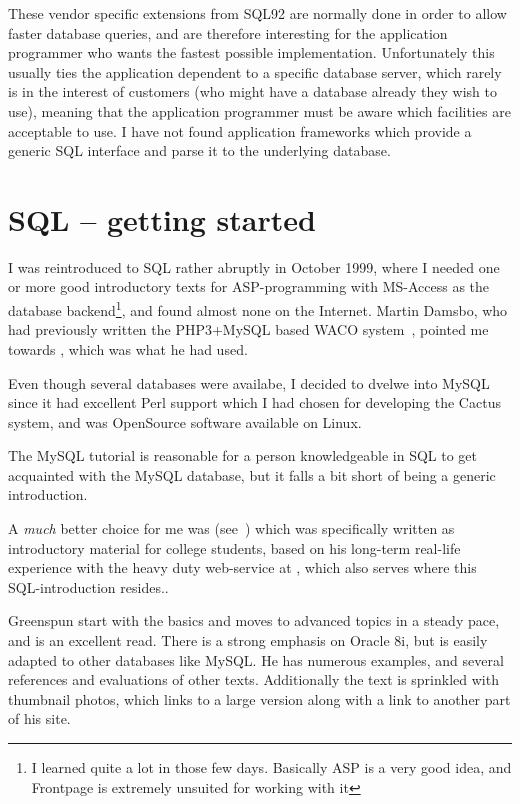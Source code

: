 These vendor specific extensions from SQL92 are normally done in order
to allow faster database queries, and are therefore interesting for
the application programmer who wants the fastest possible
implementation.  Unfortunately this usually ties the application
dependent to a specific database server, which rarely is in the
interest of customers (who might have a database already they wish to
use), meaning that the application programmer must be aware which
facilities are acceptable to use.  I have not found application
frameworks which provide a generic SQL interface and parse it to the
underlying database.


\section{SQL -- getting started}
\label{sec:sql-getting-started}

I was reintroduced to SQL rather abruptly in October 1999, where I
needed one or more good introductory texts for ASP-programming with
MS-Access as the database backend\footnote{I learned quite a lot in
  those few days.  Basically ASP is a very good idea, and Frontpage is
  extremely unsuited for working with it}, and found almost none on
the Internet.  Martin Damsbo, who had previously written the
PHP3+MySQL based WACO system~\cite{mez-waco}, pointed me towards
, which was what he had used.

Even though several databases were availabe, I decided to dvelwe into
MySQL since it had excellent Perl support which I had chosen for
developing the Cactus system,
and was OpenSource software available on Linux.

The MySQL tutorial is reasonable for a person knowledgeable in SQL to
get acquainted with the MySQL database, but it falls a bit short of
being a generic introduction.


A \textit{much} better choice for me was
(see~\cite{greenspun:sql-for-web-nerds}) which was specifically written as
introductory material for college students, based on his long-term
real-life experience with the heavy duty web-service at
, which also serves
 where this SQL-introduction
resides..

Greenspun start with the basics and moves to advanced
topics in a steady pace, and is an excellent read.  There is a strong
emphasis on Oracle 8i, but is easily adapted to other databases like
MySQL.  He has numerous examples, and several references and
evaluations of other texts.  Additionally the text is sprinkled with
thumbnail photos, which links to a large version along with a link to
another part of his site.

